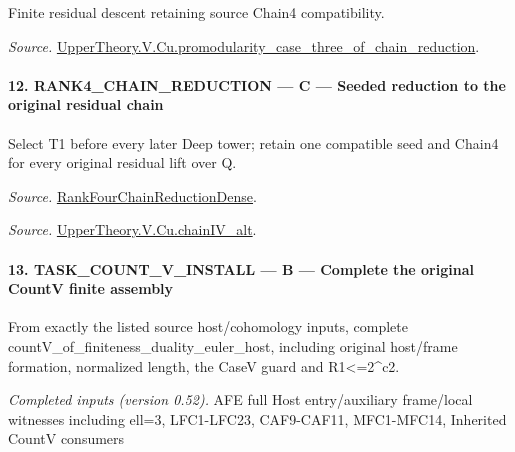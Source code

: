 Finite residual descent retaining source Chain4 compatibility.

\emph{Source.} \href{https://github.com/CocoSgt/riemann-hypothesis-lean/blob/7cbf7a0c32fca1badf05931879a37c3f8a2b03b4/src/Development/AutomorphicArithmetic/AutomorphicVarieties/ModularityArgument/ThresholdArguments/DenseThresholdCases/PromodularityCaseThreeOfLemmas.lean#L131-L153}{UpperTheory.V.Cu.promodularity\_\allowbreak case\_\allowbreak three\_\allowbreak of\_\allowbreak chain\_\allowbreak reduction}.



\paragraph{12. RANK4\_\allowbreak CHAIN\_\allowbreak REDUCTION — C — Seeded reduction to the original residual chain}

Select T1 before every later Deep tower; retain one compatible seed and Chain4 for every original residual lift over Q.

\emph{Source.} \href{https://github.com/CocoSgt/riemann-hypothesis-lean/blob/7cbf7a0c32fca1badf05931879a37c3f8a2b03b4/src/Development/AutomorphicArithmetic/AutomorphicVarieties/ModularityArgument/ThresholdArguments/DenseThresholdCases/PromodularityCaseThree.lean#L33-L39}{RankFourChainReductionDense}.

\emph{Source.} \href{https://github.com/CocoSgt/riemann-hypothesis-lean/blob/7cbf7a0c32fca1badf05931879a37c3f8a2b03b4/src/Development/AutomorphicArithmetic/AutomorphicVarieties/ModularityArgument/ThresholdArguments/DenseThresholdCases/CuPChainIV.lean#L16-L82}{UpperTheory.V.Cu.chainIV\_\allowbreak alt}.



\paragraph{13. TASK\_\allowbreak COUNT\_\allowbreak V\_\allowbreak INSTALL — B — Complete the original CountV finite assembly}

From exactly the listed source host/cohomology inputs, complete countV\_\allowbreak of\_\allowbreak finiteness\_\allowbreak duality\_\allowbreak euler\_\allowbreak host, including original host/frame formation, normalized length, the CaseV guard and R1<=2\textasciicircum{}c2.

\emph{Completed inputs (version 0.52).} AFE full Host entry/auxiliary frame/local witnesses including ell=3, LFC1-LFC23, CAF9-CAF11, MFC1-MFC14, Inherited CountV consumers

